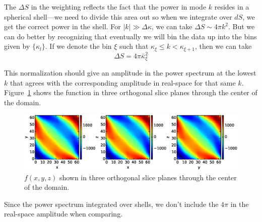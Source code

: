 \documentclass[11pt]{article}
\begin{document}
The $\Delta S$ in the weighting reflects the fact that the power 
in mode $k$ resides in a spherical shell---we need to divide this
area out so when we integrate over $dS$, we get the correct power
in the shell.  For $|k| \gg \Delta \kappa$, we can take $\Delta S \sim
4\pi k^2$.  But we can do better by recognizing that eventually we
will bin the data up into the bins given by $\{\kappa_l\}$.  If we
denote the bin $\xi$ such that $\kappa_\xi \le k < \kappa_{\xi+1}$,
then we can take
\begin{equation}
\Delta S = 4 \pi \bar{\kappa}_\xi^2
\end{equation}

This normalization should give an amplitude in the power spectrum at the lowest
$k$ that agrees with the corresponding amplitude in real-space for that same $k$.  
Figure~\ref{fig:phireal} shows the function in three orthogonal slice planes
through the center of the domain.

\begin{figure}[t]
\centering
\includegraphics[width=\linewidth]{phi}
\caption{\label{fig:phireal} $f(x,y,z)$ shown in three orthogonal slice
planes through the center of the domain.}
\end{figure}

Since the power spectrum integrated over shells, we don't include the $4\pi$
in the real-space amplitude when comparing. 
\end{document}

